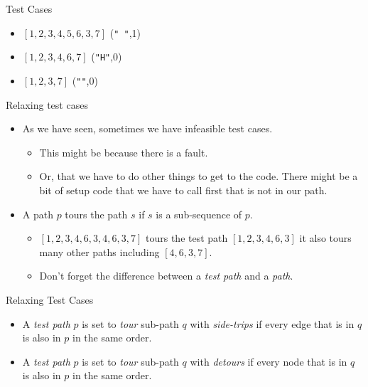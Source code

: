 \documentclass[handout]{beamer}
\begin{document}
\begin{frame}{Test Cases}
  \begin{itemize}
  \item $[1,2,3,4,5,6,3,7]$  ({\tt " "},1)
  \item $[1,2,3,4,6,7]$    ({\tt "H"},0)
  \item $[1,2,3,7]$       ({\tt ""},0)
  \end{itemize}
  \end{frame}

\begin{frame}{Relaxing test cases}
  \begin{itemize}
  \item As we have seen, sometimes we have infeasible  test cases. 
    \begin{itemize}
    \item This might be because there is a fault.
    \item Or, that we have to do other things to get to the
      code. There might be a bit of setup code that we have to call
      first that is not in our path.
    \end{itemize}
  \item A path $p$ tours the path $s$ if $s$ is a sub-sequence of $p$.
    \begin{itemize}
    \item $[1,2,3,4,6,3,4,6,3,7]$ tours  the test path $[1,2,3,4,6,3]$ it
      also tours many other paths including $[4,6,3,7]$. 
    \item Don't forget the difference between a {\it test path} and a {\it path}.
    \end{itemize}
  \end{itemize}
    
\end{frame}
\begin{frame}{Relaxing Test Cases}
  \begin{itemize}
  \item A {\it test path} $p$ is set to {\em tour} sub-path $q$ with {\em
      side-trips} if every edge that is in $q$ is also in $p$ in the
    same order.
  \item A {\it test path} $p$ is set to {\em tour} sub-path $q$ with {\em
      detours} if every node that is in $q$ is also in $p$ in the
    same order.
  \end{itemize}
  
\end{frame}
\end{document}

